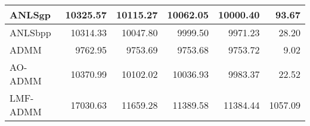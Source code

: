 \documentclass{article}
\begin{document}
\begin{table}[H]
\begin{tabular}{|l|r|r|r|r|r|}
		ANLSgp   & 10325.57                & 10115.27                & 10062.05                 & 10000.40                 & 93.67                        \\ \hline
		ANLSbpp  & 10314.33                & 10047.80                & 9999.50                  & 9971.23                  & 28.20                        \\ \hline
		ADMM     & 9762.95                 & 9753.69                 & 9753.68                  & 9753.72                  & 9.02                         \\ \hline
		AO-ADMM  & 10370.99                & 10102.02                & 10036.93                 & 9983.37                  & 22.52                        \\ \hline
		LMF-ADMM & 17030.63                & 11659.28                & 11389.58                 & 11384.44                 & 1057.09                      \\ \hline
	\end{tabular}
\end{table}
\end{document}
